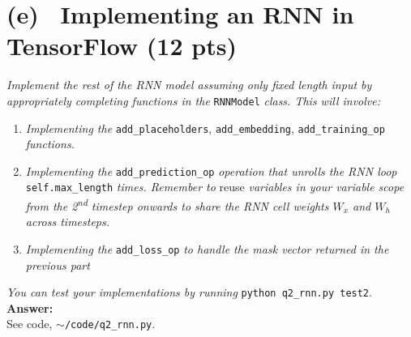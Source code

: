 \documentclass[fleqn]{MJD}
\newcommand{\subproblem}[2]{\section{(#1)~ #2}}
\newcommand{\0}{\emptyset}
\newcommand{\ts}{\textsuperscript}
\begin{document}
\newpage

\subproblem{e}{Implementing an RNN in TensorFlow (12 pts)}
%
\textit{Implement the rest of the RNN model assuming only fixed length input by appropriately completing functions in the} \verb|RNNModel| \textit{class. This will involve:}
%
\begin{enumerate}
	\item \textit{Implementing the} \verb|add_placeholders|, \verb|add_embedding|, \verb|add_training_op| \textit{functions.}
	\item \textit{Implementing the} \verb|add_prediction_op| \textit{operation that unrolls the RNN loop} \verb|self.max_length| \textit{times. Remember to} reuse \textit{variables in your variable scope from the 2\ts{nd} timestep onwards to share the RNN cell weights $W_{x}$ and $W_{h}$ across timesteps.}
	\item \textit{Implementing the} \verb|add_loss_op| \textit{to handle the mask vector returned in the previous part}
\end{enumerate}
%
\textit{You can test your implementations by running} \verb|python q2_rnn.py test2|. \\


\noindent \textbf{Answer:}\\

\noindent See code, $\sim$\verb|/code/q2_rnn.py|.
\end{document}
